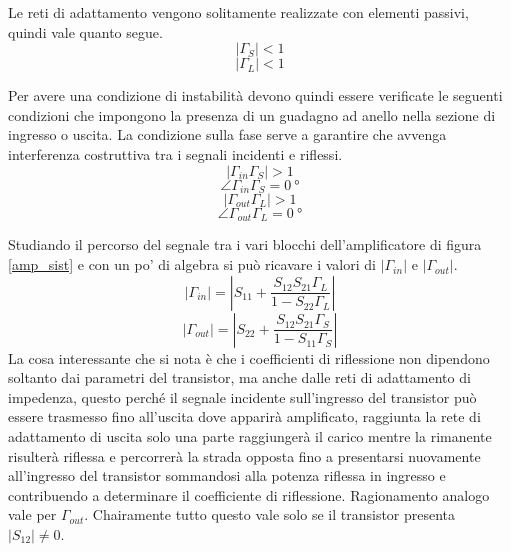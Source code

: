 \documentclass[12pt,oneside]{book}
\begin{document}
Le reti di adattamento vengono solitamente realizzate con elementi passivi, quindi vale quanto segue.
\begin{equation}
    \left|\Gamma_{S}\right| < 1
\end{equation}
\begin{equation}
    \left|\Gamma_{L}\right| < 1
\end{equation}

Per avere una condizione di instabilità devono quindi essere verificate le seguenti condizioni che impongono la presenza di un guadagno ad anello nella sezione di ingresso o uscita. La condizione sulla fase serve a garantire che avvenga interferenza costruttiva tra i segnali incidenti e riflessi.
\begin{equation}
    \left|\Gamma_{in}\Gamma_{S}\right| > 1
\end{equation}
\begin{equation}
    \angle\Gamma_{in}\Gamma_{S} = \SI{0}{\degree}
\end{equation}
\begin{equation}
    \left|\Gamma_{out}\Gamma_{L}\right| > 1
\end{equation}
\begin{equation}
    \angle\Gamma_{out}\Gamma_{L} = \SI{0}{\degree}
\end{equation}

Studiando il percorso del segnale tra i vari blocchi dell'amplificatore di figura \ref{amp_sist} e con un po' di algebra si può ricavare i valori di $\left|\Gamma_{in}\right|$ e $\left|\Gamma_{out}\right|$.
\begin{equation}
    \left|\Gamma_{in}\right| = \left|S_{11} + \dfrac{S_{12}S_{21}\Gamma_{L}}{1-S_{22}\Gamma_{L}}\right|
\end{equation}
\begin{equation}
    \left|\Gamma_{out}\right| = \left|S_{22} + \dfrac{S_{12}S_{21}\Gamma_{S}}{1-S_{11}\Gamma_{S}}\right|
\end{equation}
La cosa interessante che si nota è che i coefficienti di riflessione non dipendono soltanto dai parametri del transistor, ma anche dalle reti di adattamento di impedenza, questo perché il segnale incidente sull'ingresso del transistor può essere trasmesso fino all'uscita dove apparirà amplificato, raggiunta la rete di adattamento di uscita solo una parte raggiungerà il carico mentre la rimanente risulterà riflessa e percorrerà la strada opposta fino a presentarsi nuovamente all'ingresso del transistor sommandosi alla potenza riflessa in ingresso e contribuendo a determinare il coefficiente di riflessione. Ragionamento analogo vale per $\Gamma_{out}$. Chairamente tutto questo vale solo se il transistor presenta $\left|S_{12}\right|\neq 0$.
\end{document}
